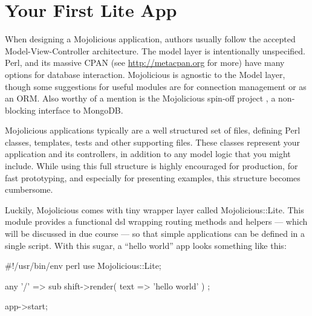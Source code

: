 \section{Your First Lite App}


When designing a Mojolicious application, authors usually follow the accepted Model-View-Controller architecture.
The model layer is intentionally unspecified.
Perl, and its massive CPAN (see \url{http://metacpan.org} for more) have many options for database interaction.
Mojolicious is agnostic to the Model layer, though some suggestions for useful modules are  for connection management or  as an ORM.
Also worthy of a mention is the Mojolicious spin-off project , a non-blocking interface to MongoDB.

Mojolicious applications typically are a well structured set of files, defining Perl classes, templates, tests and other supporting files.
These classes represent your application and its controllers, in addition to any model logic that you might include.
While using this full structure is highly encouraged for production, for fast prototyping, and especially for presenting examples, this structure becomes cumbersome.

Luckily, Mojolicious comes with tiny wrapper layer called Mojolicious::Lite.
This module provides a functional dsl wrapping routing methods and helpers --- which will be discussed in due course --- so that simple applications can be defined in a single script.
With this sugar, a ``hello world'' app looks something like this:
\begin{mojolite}
#!/usr/bin/env perl
use Mojolicious::Lite;

any '/' => sub { shift->render( text => 'hello world' ) };

app->start;
\end{mojolite}



